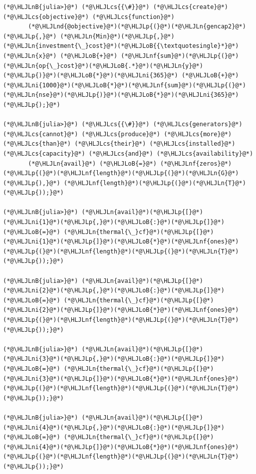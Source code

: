 \documentclass[12pt,a4paper]{article}
\newcommand{\HLJLn}[1]{#1}
\newcommand{\HLJLnd}[1]{\textcolor[RGB]{214,102,97}{#1}}
\newcommand{\HLJLnf}[1]{\textcolor[RGB]{66,102,213}{#1}}
\newcommand{\HLJLnB}[1]{\textcolor[RGB]{59,151,46}{#1}}
\newcommand{\HLJLni}[1]{\textcolor[RGB]{59,151,46}{#1}}
\newcommand{\HLJLoB}[1]{\textcolor[RGB]{102,102,102}{\textbf{#1}}}
\newcommand{\HLJLp}[1]{#1}
\newcommand{\HLJLcs}[1]{\textcolor[RGB]{153,153,119}{\textit{#1}}}
\begin{document}
\begin{lstlisting}
(*@\HLJLnB{julia>}@*) (*@\HLJLcs{{\#}}@*) (*@\HLJLcs{create}@*) (*@\HLJLcs{objective}@*) (*@\HLJLcs{function}@*)
       (*@\HLJLnd{@objective}@*)(*@\HLJLp{(}@*)(*@\HLJLn{gencap2}@*)(*@\HLJLp{,}@*) (*@\HLJLn{Min}@*)(*@\HLJLp{,}@*) (*@\HLJLn{investment{\_}cost}@*)(*@\HLJLoB{{\textquotesingle}*}@*)(*@\HLJLn{x}@*) (*@\HLJLoB{+}@*) (*@\HLJLnf{sum}@*)(*@\HLJLp{(}@*)(*@\HLJLn{op{\_}cost}@*)(*@\HLJLoB{.*}@*)(*@\HLJLn{y}@*)(*@\HLJLp{)}@*)(*@\HLJLoB{*}@*)(*@\HLJLni{365}@*) (*@\HLJLoB{+}@*) (*@\HLJLni{1000}@*)(*@\HLJLoB{*}@*)(*@\HLJLnf{sum}@*)(*@\HLJLp{(}@*)(*@\HLJLn{nse}@*)(*@\HLJLp{)}@*)(*@\HLJLoB{*}@*)(*@\HLJLni{365}@*)(*@\HLJLp{);}@*)

(*@\HLJLnB{julia>}@*) (*@\HLJLcs{{\#}}@*) (*@\HLJLcs{generators}@*) (*@\HLJLcs{cannot}@*) (*@\HLJLcs{produce}@*) (*@\HLJLcs{more}@*) (*@\HLJLcs{than}@*) (*@\HLJLcs{their}@*) (*@\HLJLcs{installed}@*) (*@\HLJLcs{capacity}@*) (*@\HLJLcs{and}@*) (*@\HLJLcs{availability}@*)
       (*@\HLJLn{avail}@*) (*@\HLJLoB{=}@*) (*@\HLJLnf{zeros}@*)(*@\HLJLp{(}@*)(*@\HLJLnf{length}@*)(*@\HLJLp{(}@*)(*@\HLJLn{G}@*)(*@\HLJLp{),}@*) (*@\HLJLnf{length}@*)(*@\HLJLp{(}@*)(*@\HLJLn{T}@*)(*@\HLJLp{));}@*)

(*@\HLJLnB{julia>}@*) (*@\HLJLn{avail}@*)(*@\HLJLp{[}@*)(*@\HLJLni{1}@*)(*@\HLJLp{,}@*)(*@\HLJLoB{:}@*)(*@\HLJLp{]}@*) (*@\HLJLoB{=}@*) (*@\HLJLn{thermal{\_}cf}@*)(*@\HLJLp{[}@*)(*@\HLJLni{1}@*)(*@\HLJLp{]}@*)(*@\HLJLoB{*}@*)(*@\HLJLnf{ones}@*)(*@\HLJLp{(}@*)(*@\HLJLnf{length}@*)(*@\HLJLp{(}@*)(*@\HLJLn{T}@*)(*@\HLJLp{));}@*)

(*@\HLJLnB{julia>}@*) (*@\HLJLn{avail}@*)(*@\HLJLp{[}@*)(*@\HLJLni{2}@*)(*@\HLJLp{,}@*)(*@\HLJLoB{:}@*)(*@\HLJLp{]}@*) (*@\HLJLoB{=}@*) (*@\HLJLn{thermal{\_}cf}@*)(*@\HLJLp{[}@*)(*@\HLJLni{2}@*)(*@\HLJLp{]}@*)(*@\HLJLoB{*}@*)(*@\HLJLnf{ones}@*)(*@\HLJLp{(}@*)(*@\HLJLnf{length}@*)(*@\HLJLp{(}@*)(*@\HLJLn{T}@*)(*@\HLJLp{));}@*)

(*@\HLJLnB{julia>}@*) (*@\HLJLn{avail}@*)(*@\HLJLp{[}@*)(*@\HLJLni{3}@*)(*@\HLJLp{,}@*)(*@\HLJLoB{:}@*)(*@\HLJLp{]}@*) (*@\HLJLoB{=}@*) (*@\HLJLn{thermal{\_}cf}@*)(*@\HLJLp{[}@*)(*@\HLJLni{3}@*)(*@\HLJLp{]}@*)(*@\HLJLoB{*}@*)(*@\HLJLnf{ones}@*)(*@\HLJLp{(}@*)(*@\HLJLnf{length}@*)(*@\HLJLp{(}@*)(*@\HLJLn{T}@*)(*@\HLJLp{));}@*)

(*@\HLJLnB{julia>}@*) (*@\HLJLn{avail}@*)(*@\HLJLp{[}@*)(*@\HLJLni{4}@*)(*@\HLJLp{,}@*)(*@\HLJLoB{:}@*)(*@\HLJLp{]}@*) (*@\HLJLoB{=}@*) (*@\HLJLn{thermal{\_}cf}@*)(*@\HLJLp{[}@*)(*@\HLJLni{4}@*)(*@\HLJLp{]}@*)(*@\HLJLoB{*}@*)(*@\HLJLnf{ones}@*)(*@\HLJLp{(}@*)(*@\HLJLnf{length}@*)(*@\HLJLp{(}@*)(*@\HLJLn{T}@*)(*@\HLJLp{));}@*)


\end{lstlisting}
\end{document}

